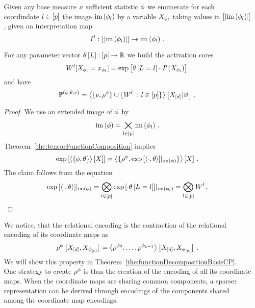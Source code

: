 \begin{theorem}\label{def:expFamilyTensorRep}
	Given any base measure $\nu$ sufficient statistic $\phi$ we enumerate for each coordindate $l\in[p]$ the image $\mathrm{im}\left(\phi_{l}\right)$ by a variable $X_{\phi_{l}}$ taking values in $[\left|\mathrm{im}\left(\phi_{l}\right)\right|]$, given an interpretation map
		\[ I^{l} : 
		[\left|\mathrm{im}\left(\phi_{l}\right)\right|] \rightarrow \mathrm{im}\left(\phi_{l}\right) \, . \]
	
	For any parameter vector $\theta\left[L\right]:[p]\rightarrow\mathbb{R}$ we build the activation cores
		\[ W^{l}[X_{\phi_{l}}=x_{\phi_{l}}] 
		= \mathrm{exp}\left[\theta\left[L_{}=l_{}\right] \cdot I^{l}(X_{\phi_{l}}) \right] \,   \]
	and have
		\[ \mathbb{P}^{(\phi,\theta,\nu)} = 
		\left\langle \{\nu,\rho^{\phi}\}\cup\{W^{l} \, : \, l\in[p]\}\right\rangle \left[ X_{[d]} | \varnothing \right] \, . 
		\]
\end{theorem}
\begin{proof}
	We use an extended image of $\phi$ by  %
		\[ \mathrm{im}\left(\phi\right) = \bigtimes_{l\in[p]} \mathrm{im}\left(\phi_{l}\right) \, . \]
	Theorem~\ref{the:tensorFunctionComposition} implies
		\[ \mathrm{exp}\left[\left\langle \{\phi, \theta\}\right\rangle \left[ X \right]\right]
		= \left\langle \{\rho^{\phi}, {\mathrm{exp}\left[\braket{\cdot, \theta}\right]}|_{\mathrm{im}\left(\phi\right)} \}\right\rangle \left[ X \right] \, . \]
	The claim follows from the equation
		\[ {\mathrm{exp}\left[\braket{\cdot, \theta}\right]}|_{\mathrm{im}\left(\phi\right)} 
		= \bigotimes_{l\in[p]} {\mathrm{exp}\left[\cdot \theta\left[L_{}=l_{}\right]\right]}|_{\mathrm{im}\left(\phi_{l}\right)}  
		= \bigotimes_{l\in[p]} W^{l} \, . \]
\end{proof}


We notice, that the relational encoding is the contraction of the relational encoding of its coordinate maps as 
	\[ \rho^{\phi}\left[X_{[d]},X_{\phi_{[p]}}\right] = \left\langle \rho^{\phi_{0}},\ldots,\rho^{\phi_{p-1}}\right\rangle \left[ X_{[d]},X_{\phi_{[p]}} \right] \, .  \]
We will show this property in Theorem~\ref{the:functionDecompositionBasisCP}.
One strategy to create $\rho^{\phi}$ is thus the creation of the encoding of all its coordinate maps.
When the coordinate maps are sharing common components, a sparser representation can be derived through encodings of the components shared among the coordinate map encodings.


